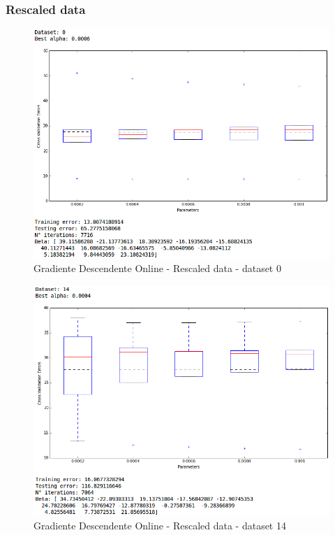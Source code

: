 \documentclass[spanish, fleqn]{article}
\begin{document}
\begin{enumerate}
\subsubsection*{Rescaled data}
\begin{figure}[!htpb]
\centering
 \includegraphics[scale=0.45]{gd_online_rescaled0.png}
 \caption{Gradiente Descendente Online - Rescaled data - dataset 0}
\end{figure}

\begin{figure}[!htpb]
\centering
 \includegraphics[scale=0.45]{gd_online_rescaled14.png}
 \caption{Gradiente Descendente Online - Rescaled data - dataset 14}
\end{figure}


\end{enumerate}
\end{document}
